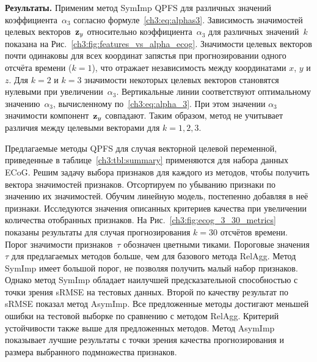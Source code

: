 \documentclass[11pt, a5paper]{dissert}
\begin{document}
\textbf{Результаты.}
Применим метод SymImp QPFS для различных значений коэффициента~$\alpha_3$ согласно формуле~\eqref{ch3:eq:alphas3}.
Зависимость значимостей целевых векторов~$\mathbf{z}_y$ относительно коэффициента~$\alpha_3$ для различных значений~$k$ показана на Рис.~\ref{ch3:fig:features_vs_alpha_ecog}.
Значимости целевых векторов почти одинаковы для всех координат запястья при прогнозировании одного отсчёта времени ($k = 1$), 
что отражает независимость между координатами $x$, $y$ и $z$.
Для $k = 2$ и $k = 3$ значимости некоторых целевых векторов становятся нулевыми при увеличении~$\alpha_3$.
Вертикальные линии соответствуют оптимальному значению~$\alpha_3$, вычисленному по~\eqref{ch3:eq:alpha_3}. 
При этом значении $\alpha_3$ значимости компонент~$\mathbf{z}_y$ совпадают. 
Таким образом, метод не учитывает различия между целевыми векторами для $k=1, 2, 3$.

Предлагаемые методы QPFS для случая векторной целевой переменной, приведенные в таблице~\ref{ch3:tbl:summary} применяются для набора данных ECoG. 
Решим задачу выбора признаков для каждого из методов, чтобы получить вектора значимостей признаков. 
Отсортируем по убыванию признаки по значению их значимостей. Обучим линейную модель, постепенно добавляя в неё признаки. 
Исследуются значения описанных критериев качества при увеличении количества отобранных признаков. 
На Рис.~\ref{ch3:fig:ecog_3_30_metrics} показаны результаты для случая прогнозирования $k = 30$ отсчётов времени. 
Порог значимости признаков~$\tau$ обозначен цветными тиками. 
Пороговые значения $\tau$ для предлагаемых методов больше, чем для базового метода RelAgg. 
Метод SymImp имеет большой порог, не позволяя получить малый набор признаков.
Однако метод SymImp обладает наилучшей предсказательной способностью с точки зрения sRMSE на тестовых данных.
Второй по качеству результат по sRMSE показал метод AsymImp.
Все предложенные методы достигают меньшей ошибки на тестовой выборке по сравнению с методом RelAgg. 
Критерий устойчивости также выше для предложенных методов.
Метод AsymImp показывает лучшие результаты с точки зрения качества прогнозирования и размера выбранного подмножества признаков.
\end{document}
